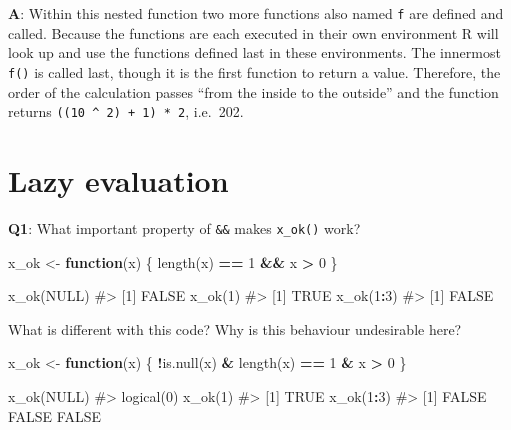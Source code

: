 \documentclass[
]{krantz}
\makeatletter
\newenvironment{Shaded}{\begin{snugshade}}{\end{snugshade}}
\newcommand{\CommentTok}[1]{\textcolor[rgb]{0.56,0.35,0.01}{\textit{#1}}}
\newcommand{\ControlFlowTok}[1]{\textcolor[rgb]{0.13,0.29,0.53}{\textbf{#1}}}
\newcommand{\DecValTok}[1]{\textcolor[rgb]{0.00,0.00,0.81}{#1}}
\newcommand{\KeywordTok}[1]{\textcolor[rgb]{0.13,0.29,0.53}{\textbf{#1}}}
\newcommand{\NormalTok}[1]{#1}
\newcommand{\OperatorTok}[1]{\textcolor[rgb]{0.81,0.36,0.00}{\textbf{#1}}}
\newcommand{\OtherTok}[1]{\textcolor[rgb]{0.56,0.35,0.01}{#1}}
\newcommand{\StringTok}[1]{\textcolor[rgb]{0.31,0.60,0.02}{#1}}
\newenvironment{kframe}{%
\medskip{}
\setlength{\fboxsep}{.8em}
 \def\at@end@of@kframe{}%
 \ifinner\ifhmode%
  \def\at@end@of@kframe{\end{minipage}}%
  \begin{minipage}{\columnwidth}%
 \fi\fi%
 \def\FrameCommand##1{\hskip\@totalleftmargin \hskip-\fboxsep
 \colorbox{shadecolor}{##1}\hskip-\fboxsep
     \hskip-\linewidth \hskip-\@totalleftmargin \hskip\columnwidth}%
 \MakeFramed {\advance\hsize-\width
   \@totalleftmargin\z@ \linewidth\hsize
   \@setminipage}}%
 {\par\unskip\endMakeFramed%
 \at@end@of@kframe}
\renewenvironment{Shaded}{\begin{kframe}}{\end{kframe}}
\renewcommand{\KeywordTok} [1]{\textcolor[rgb]{0.00,0.44,0.13}{{#1}}}
\renewcommand{\DecValTok}  [1]{\textcolor[rgb]{0.25,0.63,0.44}{{#1}}}
\renewcommand{\StringTok}  [1]{\textcolor[rgb]{0.25,0.44,0.63}{{#1}}}
\renewcommand{\CommentTok} [1]{\textcolor[rgb]{0.38,0.63,0.69}{{#1}}}
\renewcommand{\OtherTok}   [1]{\textcolor[rgb]{0.00,0.44,0.13}{{#1}}}
\renewcommand{\NormalTok}  [1]{{#1}}
\makeatother
\begin{document}
\textbf{{A}}: Within this nested function two more functions also named \texttt{f} are defined and called. Because the functions are each executed in their own environment R will look up and use the functions defined last in these environments. The innermost \texttt{f()} is called last, though it is the first function to return a value. Therefore, the order of the calculation passes ``from the inside to the outside'' and the function returns \texttt{((10\ \^{}\ 2)\ +\ 1)\ *\ 2}, i.e.~202.

\hypertarget{lazy-evaluation}{%
\section{Lazy evaluation}\label{lazy-evaluation}}

\textbf{{Q1}}: What important property of \texttt{\&\&} makes \texttt{x\_ok()} work?

\begin{Shaded}
\begin{Highlighting}[]
\NormalTok{x_ok <-}\StringTok{ }\ControlFlowTok{function}\NormalTok{(x) \{}
  \KeywordTok{length}\NormalTok{(x) }\OperatorTok{==}\StringTok{ }\DecValTok{1} \OperatorTok{&&}\StringTok{ }\NormalTok{x }\OperatorTok{>}\StringTok{ }\DecValTok{0}
\NormalTok{\}}

\KeywordTok{x_ok}\NormalTok{(}\OtherTok{NULL}\NormalTok{)}
\CommentTok{#> [1] FALSE}
\KeywordTok{x_ok}\NormalTok{(}\DecValTok{1}\NormalTok{)}
\CommentTok{#> [1] TRUE}
\KeywordTok{x_ok}\NormalTok{(}\DecValTok{1}\OperatorTok{:}\DecValTok{3}\NormalTok{)}
\CommentTok{#> [1] FALSE}
\end{Highlighting}
\end{Shaded}

What is different with this code? Why is this behaviour undesirable here?

\begin{Shaded}
\begin{Highlighting}[]
\NormalTok{x_ok <-}\StringTok{ }\ControlFlowTok{function}\NormalTok{(x) \{}
  \OperatorTok{!}\KeywordTok{is.null}\NormalTok{(x) }\OperatorTok{&}\StringTok{ }\KeywordTok{length}\NormalTok{(x) }\OperatorTok{==}\StringTok{ }\DecValTok{1} \OperatorTok{&}\StringTok{ }\NormalTok{x }\OperatorTok{>}\StringTok{ }\DecValTok{0}
\NormalTok{\}}

\KeywordTok{x_ok}\NormalTok{(}\OtherTok{NULL}\NormalTok{)}
\CommentTok{#> logical(0)}
\KeywordTok{x_ok}\NormalTok{(}\DecValTok{1}\NormalTok{)}
\CommentTok{#> [1] TRUE}
\KeywordTok{x_ok}\NormalTok{(}\DecValTok{1}\OperatorTok{:}\DecValTok{3}\NormalTok{)}
\CommentTok{#> [1] FALSE FALSE FALSE}
\end{Highlighting}
\end{Shaded}
\end{document}
